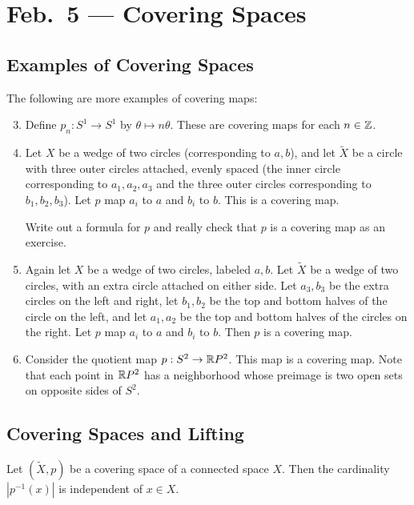 \chapter{Feb.~5 --- Covering Spaces}

\section{Examples of Covering Spaces}

\begin{example}\label{example:covering}
  The following are more examples of covering maps:
  \begin{enumerate}
    \setcounter{enumi}{2}
    \item Define $p_n : S^1 \to S^1$ by
      $\theta \mapsto n \theta$.
      These are covering maps for each $n \in \mathbb{Z}$.
    \item Let $X$ be a wedge of two circles
      (corresponding to $a, b$), and
      let $\widetilde{X}$ be a circle with
      three outer circles attached, evenly spaced (the inner
      circle corresponding to $a_1, a_2, a_3$ and
      the three outer circles corresponding to
      $b_1, b_2, b_3$). Let $p$ map
      $a_i$ to $a$ and $b_i$ to $b$. This is a covering
      map.

      Write out a formula for $p$ and really check that
      $p$ is a covering map as an exercise.
    \item Again let $X$ be a wedge of two circles,
      labeled $a, b$. Let $\widetilde{X}$ be a wedge of
      two circles, with an extra circle attached on
      either side. Let $a_3, b_3$ be the extra circles
      on the left and right, let $b_1, b_2$ be
      the top and bottom halves of the circle on the
      left, and let $a_1, a_2$ be the top and bottom
      halves of the circles on the right. Let
      $p$ map $a_i$ to $a$ and $b_i$ to $b$. Then
      $p$ is a covering map.
    \item Consider the quotient map
      $p : S^2 \to \mathbb{R} P^2$.
      This map is a covering map.
      Note that each point
      in $\mathbb{R} P^2$ has a neighborhood whose preimage
      is two open sets on opposite sides of $S^2$.
  \end{enumerate}
\end{example}

\section{Covering Spaces and Lifting}
\begin{lemma}
  Let $(\widetilde{X}, p)$ be a covering space of a
  connected space $X$. Then the cardinality
  $|p^{-1}(x)|$ is independent of $x \in X$.
\end{lemma}


